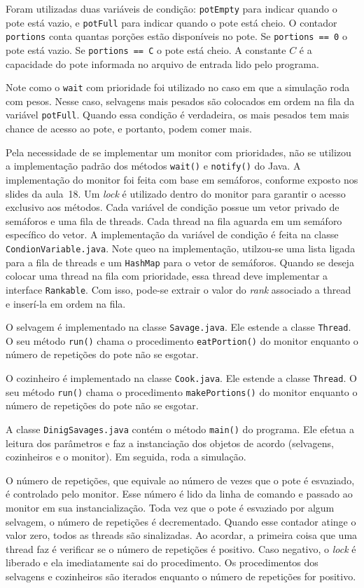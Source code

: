 \documentclass[11pt,a4paper]{article}
\begin{document}
Foram utilizadas duas variáveis de condição: \verb|potEmpty| para indicar quando o pote está vazio, 
e \verb|potFull| para indicar quando o pote está cheio. O contador \verb|portions| conta quantas 
porções estão disponíveis no pote. Se \verb|portions == 0| o pote está vazio. Se 
\verb|portions == C| o pote está cheio. A constante $C$ é a capacidade do pote informada no arquivo 
de entrada lido pelo programa. 

Note como o \verb|wait| com prioridade foi utilizado no caso em que a simulação roda com pesos. 
Nesse caso, selvagens mais pesados são colocados em ordem na fila da variável \verb|potFull|. Quando 
essa condição é verdadeira, os mais pesados tem mais chance de acesso ao pote, e portanto, podem 
comer mais.

Pela necessidade de se implementar um monitor com prioridades, não se utilizou a implementação 
padrão dos métodos \verb|wait()| e \verb|notify()| do Java. A implementação do monitor foi feita com
base em semáforos, conforme exposto nos slides da aula~18. Um {\it lock} é utilizado dentro do 
monitor para garantir o acesso exclusivo aos métodos. Cada variável de condição possue um vetor 
privado de semáforos e uma fila de threads. Cada thread na fila aguarda em um semáforo específico do 
vetor. A implementação da variável de condição é feita na classe \verb|CondionVariable.java|. Note 
queo na implementação, utilzou-se uma lista ligada para a fila de threads e um \verb|HashMap| para o
vetor de semáforos. Quando se deseja colocar uma thread na fila com prioridade, essa thread deve 
implementar a interface \verb|Rankable|. Com isso, pode-se extrair o valor do {\it rank} associado a
thread e inserí-la em ordem na fila.

O selvagem é implementado na classe \verb|Savage.java|. Ele estende a classe \verb|Thread|. O seu 
método \verb|run()| chama o procedimento \verb|eatPortion()| do monitor enquanto o número de 
repetições do pote não se esgotar.

O cozinheiro é implementado na classe \verb|Cook.java|. Ele estende a classe \verb|Thread|. O seu 
método \verb|run()| chama o procedimento \verb|makePortions()| do monitor enquanto o número de 
repetições do pote não se esgotar.

A classe \verb|DinigSavages.java| contém o método \verb|main()| do programa. Ele efetua a leitura
dos parâmetros e faz a instanciação dos objetos de acordo (selvagens, cozinheiros e o monitor). 
Em seguida, roda a simulação.

O número de repetições, que equivale ao número de vezes que o pote é esvaziado, é controlado
pelo monitor. Esse número é lido da linha de comando e passado ao monitor em sua instancialização.
Toda vez que o pote é esvaziado por algum selvagem, o número de repetições é decrementado. Quando
esse contador atinge o valor zero, todos as threads são sinalizadas. Ao acordar, a primeira coisa
que uma thread faz é verificar se o número de repetições é positivo. Caso negativo, o {\it lock} é
liberado e ela imediatamente sai do procedimento. Os procedimentos dos selvagens e cozinheiros são
iterados enquanto o número de repetições for positivo.
\end{document}
